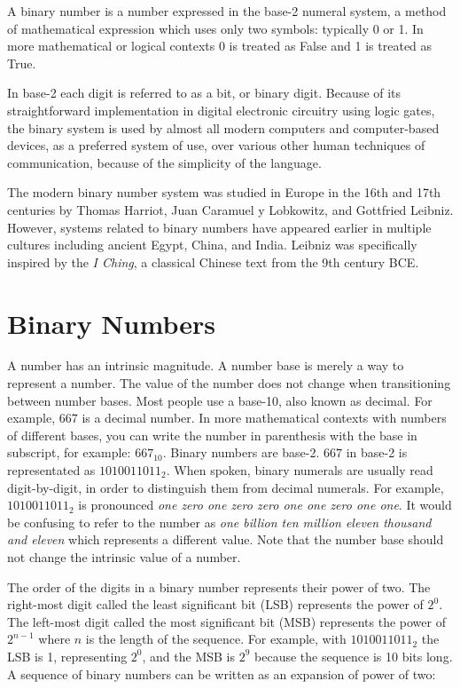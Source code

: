 \documentclass[11pt]{book}
\begin{document}
A binary number is a number expressed in the base-2 numeral system, a method of mathematical expression which uses only two symbols: typically 0 or 1. In more mathematical or logical contexts 0 is treated as False and 1 is treated as True.

In base-2 each digit is referred to as a bit, or binary digit. Because of its straightforward implementation in digital electronic circuitry using logic gates, the binary system is used by almost all modern computers and computer-based devices, as a preferred system of use, over various other human techniques of communication, because of the simplicity of the language.

The modern binary number system was studied in Europe in the 16th and 17th centuries by Thomas Harriot, Juan Caramuel y Lobkowitz, and Gottfried Leibniz. However, systems related to binary numbers have appeared earlier in multiple cultures including ancient Egypt, China, and India. Leibniz was specifically inspired by the \textit{I Ching}, a classical Chinese text from the 9th century BCE. 

\section{Binary Numbers\label{sec:data:bin}}

A number has an intrinsic magnitude. A number base is merely a way to represent a number. The value of the number does not change when transitioning between number bases. Most people use a base-10, also known as decimal. For example, 667 is a decimal number. In more mathematical contexts with numbers of different bases, you can write the number in parenthesis with the base in subscript, for example: $667_{10}$. Binary numbers are base-2. $667$ in base-2 is representated as 
$1010011011_2$. When spoken, binary numerals are usually read digit-by-digit, in order to distinguish them from decimal numerals. For example, $1010011011_2$ is pronounced \textit{one zero one zero zero one one zero one one}. It would be confusing to refer to the number as \textit{one billion ten million eleven thousand and eleven} which represents a different value. Note that the number base should not change the intrinsic value of a number.

The order of the digits in a binary number represents their power of two. The right-most digit called the least significant bit (LSB) represents the power of $2^0$. The left-most digit called the most significant bit (MSB) represents the power of $2^{n-1}$ where $n$ is the length of the sequence. For example, with $1010011011_2$ the LSB is 1, representing $2^0$, and the MSB is $2^9$ because the sequence is 10 bits long. A sequence of binary numbers can be written as an expansion of power of two:
\end{document}
